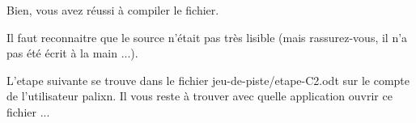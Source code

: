 \documentclass[a4paper]{article}
\newcommand{\Aa}[0]{z}
\newcommand{\Ab}[0]{a}
\newcommand{\Ac}[0]{b}
\newcommand{\Ad}[0]{c}
\newcommand{\Ae}[0]{d}
\newcommand{\Af}[0]{e}
\newcommand{\Ag}[0]{f}
\newcommand{\Ai}[0]{h}
\newcommand{\Aj}[0]{i}
\newcommand{\Ak}[0]{j}
\newcommand{\Am}[0]{l}
\newcommand{\An}[0]{m}
\newcommand{\Ao}[0]{n}
\newcommand{\Ap}[0]{o}
\newcommand{\Aq}[0]{p}
\newcommand{\Ar}[0]{q}
\newcommand{\As}[0]{r}
\newcommand{\At}[0]{s}
\newcommand{\Au}[0]{t}
\newcommand{\Av}[0]{u}
\newcommand{\Aw}[0]{v}
\newcommand{\Ay}[0]{x}
\begin{document}
B\Aj{}\Af{}\Ao{}, \Aw{}\Ap{}\Av{}\At{} \Ab{}\Aw{}\Af{}\Aa{} \As{}é\Av{}\At{}\At{}\Aj{} à \Ad{}\Ap{}\An{}\Aq{}\Aj{}\Am{}\Af{}\As{} \Am{}\Af{} \Ag{}\Aj{}\Ad{}\Ai{}\Aj{}\Af{}\As{}.

I\Am{} \Ag{}\Ab{}\Av{}\Au{} \As{}\Af{}\Ad{}\Ap{}\Ao{}\Ao{}\Ab{}\Aj{}\Au{}\As{}\Af{} \Ar{}\Av{}\Af{} \Am{}\Af{} \At{}\Ap{}\Av{}\As{}\Ad{}\Af{} \Ao{}'é\Au{}\Ab{}\Aj{}\Au{} \Aq{}\Ab{}\At{} \Au{}\As{}è\At{} \Am{}\Aj{}\At{}\Aj{}\Ac{}\Am{}\Af{} (\An{}\Ab{}\Aj{}\At{}
\As{}\Ab{}\At{}\At{}\Av{}\As{}\Af{}\Aa{}-\Aw{}\Ap{}\Av{}\At{}, \Aj{}\Am{} \Ao{}'\Ab{} \Aq{}\Ab{}\At{} é\Au{}é é\Ad{}\As{}\Aj{}\Au{} à \Am{}\Ab{} \An{}\Ab{}\Aj{}\Ao{} ...).

L'\Af{}\Au{}\Ab{}\Aq{}\Af{} \At{}\Av{}\Aj{}\Aw{}\Ab{}\Ao{}\Au{}\Af{} \At{}\Af{} \Au{}\As{}\Ap{}\Av{}\Aw{}\Af{} \Ae{}\Ab{}\Ao{}\At{} \Am{}\Af{} \Ag{}\Aj{}\Ad{}\Ai{}\Aj{}\Af{}\As{} \Ak{}\Af{}\Av{}-\Ae{}\Af{}-\Aq{}\Aj{}\At{}\Au{}\Af{}/\Af{}\Au{}\Ab{}\Aq{}\Af{}-C2.\Ap{}\Ae{}\Au{}
\At{}\Av{}\As{} \Am{}\Af{} \Ad{}\Ap{}\An{}\Aq{}\Au{}\Af{} \Ae{}\Af{} \Am{}'\Av{}\Au{}\Aj{}\Am{}\Aj{}\At{}\Ab{}\Au{}\Af{}\Av{}\As{} \Aq{}\Ab{}\Am{}\Aj{}\Ay{}\Ao{}. I\Am{} \Aw{}\Ap{}\Av{}\At{} \As{}\Af{}\At{}\Au{}\Af{} à \Au{}\As{}\Ap{}\Av{}\Aw{}\Af{}\As{} \Ab{}\Aw{}\Af{}\Ad{}
\Ar{}\Av{}\Af{}\Am{}\Am{}\Af{} \Ab{}\Aq{}\Aq{}\Am{}\Aj{}\Ad{}\Ab{}\Au{}\Aj{}\Ap{}\Ao{} \Ap{}\Av{}\Aw{}\As{}\Aj{}\As{} \Ad{}\Af{} \Ag{}\Aj{}\Ad{}\Ai{}\Aj{}\Af{}\As{} ...
\end{document}
